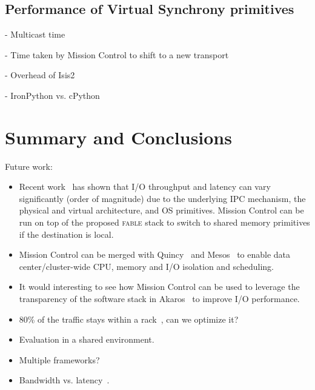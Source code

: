 \documentclass[a4paper,12pt,twoside,openright]{report}
\begin{document}
\section{Performance of Virtual Synchrony primitives}
- Multicast time

- Time taken by Mission Control to shift to a new transport

- Overhead of Isis2

- IronPython vs. cPython

\chapter{Summary and Conclusions}\label{chapter:conclusion}

Future work:

\begin{itemize}
  \item Recent work~\cite{Smith:2012:TCF} has shown that I/O throughput
	and latency can vary significantly (order of magnitude) due to the underlying
	IPC mechanism, the physical and virtual architecture, and OS primitives.
	Mission Control can be run on top of the proposed \textsc{fable} stack to
	switch to shared memory primitives if the destination is local.
   \item Mission Control can be merged with Quincy~\cite{Isard:2009:QFS} and
   Mesos~\cite{Hindman:2011:MPF} to enable data center/cluster-wide CPU, memory
   and I/O isolation and scheduling.
   \item It would interesting to see how Mission Control can be used to leverage
   the transparency of the software stack in Akaros~\cite{Rhoden:2011:IPE} to
   improve I/O performance.
   \item 80\% of the traffic stays within a rack~\cite{Benson:2010:NTC}, can we
optimize it?
	\item Evaluation in a shared environment.
	\item Multiple frameworks?
	\item Bandwidth vs. latency~\cite{Alizadeh:2012:LIM}.
\end{itemize}

\appendix
\singlespacing

 
 
\end{document}
